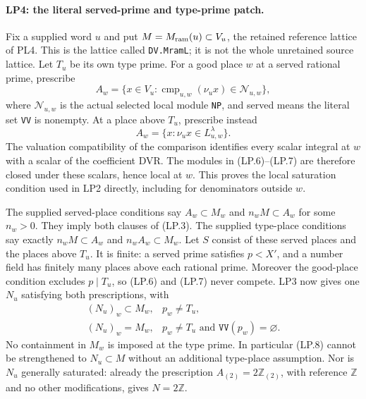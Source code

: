 \documentclass[11pt,a4paper]{article}
\numberwithin{equation}{section}
\theoremstyle{remark}\newtheorem{remark}[theorem]{Remark}
\begin{document}
\paragraph{LP4: the literal served-prime and type-prime patch.}
Fix a supplied word $u$ and put
$M=M_{\rm ram}(u)\subset V_u$, the retained reference lattice of
PL4. This is the lattice called \texttt{DV.MramL}; it is not the
whole unretained source lattice. Let $T_u$ be its own type prime.
For a good place $w$ at a served rational prime, prescribe
\[
 A_w=\{x\in V_u:\operatorname{cmp}_{u,w}(\nu_u x)
                                    \in\mathcal N_{u,w}\},       \tag{LP.6}
\]
where $\mathcal N_{u,w}$ is the actual selected local module
\texttt{NP}, and served means the literal set \texttt{VV} is
nonempty. At a place above $T_u$, prescribe instead
\[
                  A_w=\{x:\nu_u x\in L^\lambda_{u,w}\}.         \tag{LP.7}
\]
The valuation compatibility of the comparison identifies every
scalar integral at $w$ with a scalar of the coefficient DVR.
The modules in (LP.6)--(LP.7) are therefore closed under these
scalars, hence local at $w$. This proves the local saturation
condition used in LP2 directly, including for denominators outside
$w$.

The supplied served-place conditions say
$A_w\subset M_w$ and $n_wM\subset A_w$ for some $n_w>0$.
They imply both clauses of (LP.3). The supplied type-place conditions
say exactly $n_wM\subset A_w$ and $n_wA_w\subset M_w$.
Let $S$ consist of these served places and the places above $T_u$.
It is finite: a served prime satisfies $p<X'$, and a number field
has finitely many places above each rational prime. Moreover the
good-place condition excludes $p\mid T_u$, so (LP.6) and (LP.7)
never compete. LP3 now gives one $N_u$ satisfying both prescriptions,
with
\[
 \begin{array}{ll}
 (N_u)_w\subset M_w,&p_w\ne T_u,\\
 (N_u)_w=M_w,&p_w\ne T_u\text{ and }\texttt{VV}(p_w)=\varnothing.
 \end{array}                                                   \tag{LP.8}
\]
No containment in $M_w$ is imposed at the type prime. In particular
(LP.8) cannot be strengthened to $N_u\subset M$ without an
additional type-place assumption. Nor is $N_u$ generally saturated:
already the prescription $A_{(2)}=2\mathbb Z_{(2)}$, with reference
$\mathbb Z$ and no other modifications, gives $N=2\mathbb Z$.
\end{document}
